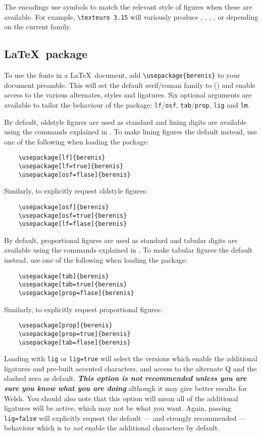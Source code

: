 \documentclass[11pt,british]{article}
\begin{document}
The encodings use symbols to match the relevant style of figures when these are available. For example, \verb|\texteuro 3.15| will variously produce , , , ,  or  depending on the current family.


\subsection{\LaTeX\ package}

To use the fonts in a \LaTeX\ document, add \verb|\usepackage{berenis}| to your document preamble. This will set the default serif/roman family to  () and enable access to the various alternates, styles and ligatures. Six optional arguments are available to tailor the behaviour of the package: \verb|lf|/\verb|osf|, \verb|tab|/\verb|prop|, \verb|lig| and \verb|lm|. 

By default, oldstyle figures are used as standard and lining digits are available using the commands explained in . To make lining figures the default instead, use one of the following when loading the package:
\begin{verbatim}
	\usepackage[lf]{berenis}
	\usepackage[lf=true]{berenis}
	\usepackage[osf=flase]{berenis}	
\end{verbatim}
Similarly, to explicitly request oldstyle figures:
\begin{verbatim}
	\usepackage[osf]{berenis}
	\usepackage[osf=true]{berenis}
	\usepackage[lf=flase]{berenis}	
\end{verbatim}

By default, proportional figures are used as standard and tabular digits are available using the commands explained in . To make tabular figures the default instead, use one of the following when loading the package:
\begin{verbatim}
	\usepackage[tab]{berenis}
	\usepackage[tab=true]{berenis}
	\usepackage[prop=flase]{berenis}	
\end{verbatim}
Similarly, to explicitly request proportional figures:
\begin{verbatim}
	\usepackage[prop]{berenis}
	\usepackage[prop=true]{berenis}
	\usepackage[tab=flase]{berenis}	
\end{verbatim}

Loading  with \verb|lig| or \verb|lig=true| will select the versions which enable the additional ligatures and pre-built accented characters, and access to the alternate Q and the slashed zero as default. \textbf{\emph{This option is not recommended unless you are sure you know what you are doing}} although it may give better results for Welsh. You should also note that this option will mean all of the additional ligatures will be active, which may not be what you want. Again, passing \verb|lig=false| will explicitly request the default --- and strongly recommended --- behaviour which is to \emph{not} enable the additional characters by default.
\end{document}
